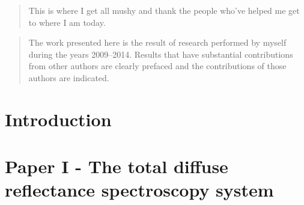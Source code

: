 \documentclass[letterpaper,12pt,twoside,openright]{report} %
\begin{document}
    \renewcommand{\abstractname}{Acknowledgements}
    \begin{abstract} \setcounter{page}{4} \thispagestyle{plain}
        This is where I get all mushy and thank the people who've helped me get to where I am today.
    \end{abstract}
    
    \setcounter{secnumdepth}{3} %
    \tableofcontents %
    {\listoffigures \let\cleardoublepage\clearpage %
    \printnomenclature} %

    \renewcommand{\abstractname}{Declaration of Academic Achievement}
    \begin{abstract} \thispagestyle{plain} \setcounter{page}{9} %
        The work presented here is the result of research performed by myself during the years 2009--2014. Results that have substantial contributions from other authors are clearly prefaced and the contributions of those authors are indicated.
    \end{abstract}
    

    \pagestyle{fancy}
    \fancyhead{}
    \fancyfoot{}
    \fancyfoot[CE,CO]{\thepage}



\chapter{Introduction}

\printbibliography[heading=subbibliography]

\chapter{Paper I - The total diffuse reflectance spectroscopy system}

\printbibliography[heading=subbibliography]
\end{document}
